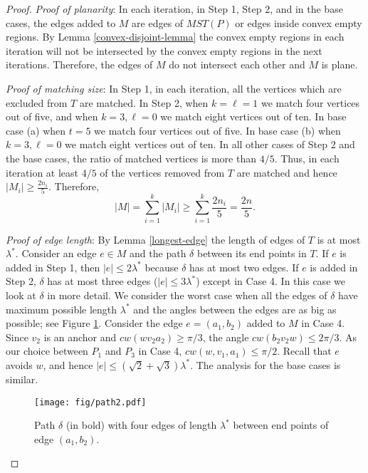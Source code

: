 \documentclass[11pt,a4paper]{article}
\newcommand{\btopt}{\lambda^*}
\newcommand{\cw}{cw}
\begin{document}
\begin{proof}

 {\em Proof of planarity}: In each iteration, in Step 1, Step 2, and in the base cases, the edges added to $M$ are edges of $MST(P)$ or edges inside convex empty regions. By Lemma \ref{convex-disjoint-lemma} the convex empty regions in each iteration will not be intersected by the convex empty regions in the next iterations. Therefore, the edges of $M$ do not intersect each other and $M$ is plane.

{\em Proof of matching size}: In Step 1, in each iteration, all the vertices which are excluded from $T$ are matched. In Step 2, when $k=\ell=1$ we match four vertices out of five, and when $k=3, \ell =0$ we match eight vertices out of ten. In base case (a) when $t=5$ we match four vertices out of five. In base case (b) when $k=3, \ell =0$ we match eight vertices out of ten. In all other cases of Step 2 and the base cases, the ratio of matched vertices is more than $4/5$. Thus, in each iteration at least $4/5$ of the vertices removed from $T$ are matched and hence $|M_i|\ge\frac{2n_i}{5}$. Therefore, 
$$
 |M|= \sum_{i=1}^{k} |M_i| \ge \sum_{i=1}^{k} \frac{2n_i}{5} = \frac{2n}{5}.
$$

{\em Proof of edge length}: By Lemma \ref{longest-edge} the length of edges of $T$ is at most $\btopt$. Consider an edge $e\in M$ and the path $\delta$ between its end points in $T$. If $e$ is added in Step 1, then $|e|\le 2\btopt$ because $\delta$ has at most two edges. If $e$ is added in Step 2, $\delta$ has at most three edges ($|e|\le 3\btopt$) except in Case 4. In this case we look at $\delta$ in more detail. We consider the worst case when all the edges of $\delta$ have maximum possible length $\btopt$ and the angles between the edges are as big as possible; see Figure \ref{path-fig}. Consider the edge $e=(a_1,b_2)$ added to $M$ in Case 4. Since $v_2$ is an anchor and $\cw(wv_2a_2)\ge \pi/3$, the angle $\cw(b_2v_2w)\le 2\pi/3$. As our choice between $P_1$ and $P_3$ in Case 4, $\cw(w,v_1,a_1)\le\pi/2$. Recall that $e$ avoids $w$, and hence $|e|\le(\sqrt{2}+\sqrt{3})\btopt$. The analysis for the base cases is similar.

\begin{figure}[ht]
  \centering
    \texttt{[image: fig/path2.pdf]}
  \caption{Path $\delta$ (in bold) with four edges of length $\btopt$ between end points of edge $(a_1,b_2)$.}
\label{path-fig}
\end{figure}


\end{proof}
\end{document}
